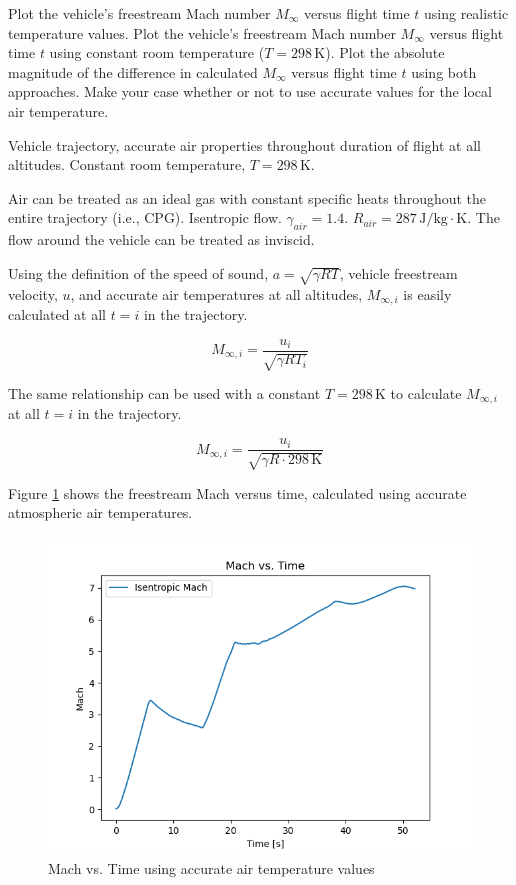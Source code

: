 \documentclass[../main.tex]{subfiles}
\begin{document}


Plot the vehicle's freestream Mach number \(M_\infty\) versus flight time \(t\) using realistic temperature values.
Plot the vehicle's freestream Mach number \(M_\infty\) versus flight time \(t\) using constant room temperature (\(T=298\,\unit{\kelvin}\)).
Plot the absolute magnitude of the difference in calculated \(M_\infty\) versus flight time \(t\) using both approaches.
Make your case whether or not to use accurate values for the local air temperature.

\givens{}
Vehicle trajectory, accurate air properties throughout duration of flight at all altitudes.
Constant room temperature, \(T=298\,\unit{\kelvin}\).

\assumptions{}
Air can be treated as an ideal gas with constant specific heats throughout the entire trajectory (i.e., CPG).
Isentropic flow.
\(\gamma_{air} = 1.4\). 
\(R_{air} = 287 \, \unit{\joule/\kilogram\cdot\kelvin}\). 
The flow around the vehicle can be treated as inviscid.

\solution{}
Using the definition of the speed of sound, \(a=\sqrt{\gamma R T}\), vehicle freestream velocity, \(u\), and accurate air temperatures at all altitudes, \(M_{\infty,i}\) is easily calculated at all \(t=i\) in the trajectory.

\[
    M_{\infty,i} = \frac{u_i}{\sqrt{\gamma R T_i}}  
\]

The same relationship can be used with a constant \(T=298\,\unit{\kelvin}\) to calculate \(M_{\infty,i}\) at all \(t=i\) in the trajectory.

\[
    M_{\infty,i} = \frac{u_i}{\sqrt{\gamma R \cdot 298 \, \unit{\kelvin}}}  
\]

Figure \ref{Mach_correct} shows the freestream Mach versus time, calculated using accurate atmospheric air temperatures.

\begin{figure}[h]
    \centering
    \includegraphics[scale=.7]{../../images/problem_1/Mach_correct_vs_Time.png}
    \caption{Mach vs. Time using accurate air temperature values}
    \label{Mach_correct}
\end{figure}
\end{document}
